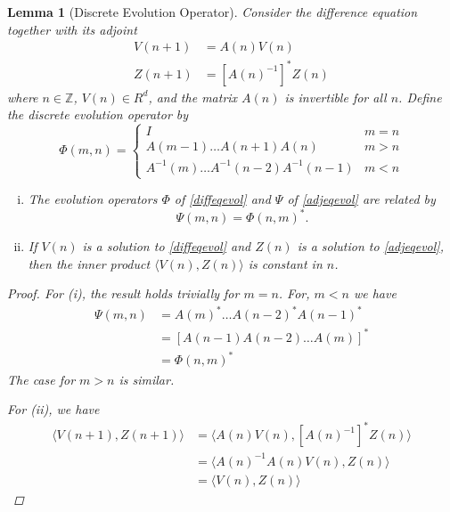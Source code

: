 \documentclass[12pt]{article}
\def\Z{{\mathbb Z}}
\newtheorem{lemma}{Lemma}
\begin{document}
\begin{lemma}[Discrete Evolution Operator]\label{evolop}
Consider the difference equation together with its adjoint
\begin{align}
V(n+1) &= A(n) V(n) \label{diffeqevol} \\
Z(n+1) &= [A(n)^{-1}]^* Z(n) \label{adjeqevol}
\end{align}
where $n \in \Z$, $V(n) \in R^d$, and the matrix $A(n)$ is invertible for all $n$. Define the discrete evolution operator by
\begin{equation}\label{evol}
\Phi(m, n) = 
\begin{cases}
I & m = n \\
A(m-1) \dots A(n+1) A(n) & m > n \\
A^{-1}(m) \dots A^{-1}(n-2) A^{-1}(n-1) & m < n
\end{cases}
\end{equation}
\begin{enumerate}[(i)]
\item The evolution operators $\Phi$ of \eqref{diffeqevol} and $\Psi$ of \eqref{adjeqevol} are related by
\begin{equation}\label{adjevol}
\Psi(m, n) = \Phi(n, m)^*.
\end{equation}
\item If $V(n)$ is a solution to \eqref{diffeqevol} and $Z(n)$ is a solution to \eqref{adjeqevol}, then the inner product $\langle V(n), Z(n) \rangle$ is constant in $n$.
\end{enumerate}

\begin{proof}
For (i), the result holds trivially for $m = n$. For, $m < n$ we have
\begin{align*}
\Psi(m, n) &= A(m)^* \dots A(n-2)^* A(n-1)^* \\
&= [A(n-1) A(n-2) \dots A(m)]^* \\
&= \Phi(n, m)^*
\end{align*}
The case for $m > n$ is similar.

For (ii), we have
\begin{align*}
\langle V(n+1), Z(n+1) \rangle &= 
\langle A(n) V(n), [A(n)^{-1}]^* Z(n) \rangle \\
&= \langle A(n)^{-1} A(n) V(n), Z(n) \rangle \\
&= \langle V(n), Z(n) \rangle
\end{align*}
\end{proof}
\end{lemma}
\end{document}
